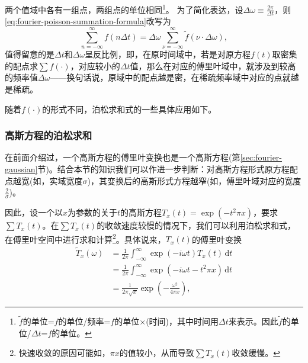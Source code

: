 两个值域中各有一组点，两组点的单位相同\footnote{
$\tilde{f}$的单位=$f$的单位/频率=$f$的单位$\times$(时间)，其中时间用$\Delta t$来表示。因此$\tilde{f}$的单位/$\Delta t$=$f$的单位。}。
为了简化表达，设$\Delta \omega \equiv \frac{2 \pi}{\Delta t}$，则\eqref{eq:fourier-poisson-summation-formula}改写为
\begin{equation}
  \label{eq:fourier-poisson-summation-formula-simp}
  \sum_{n = - \infty}^{\infty} f \left( n \Delta t \right)
  = \Delta \omega \sum_{\nu = - \infty}^{\infty}
  \tilde{f} \left( \nu \cdot \Delta \omega \right),
\end{equation}
值得留意的是$\Delta t$和$\Delta \omega$呈反比例，即，在原时间域中，若是对原方程$f(t)$取密集的配点求$\sum f(\cdot)$，对应较小的$\Delta t$值，那么在对应的傅里叶域中，就涉及到较高的频率值$\Delta \omega$——换句话说，原域中的配点越是密，在稀疏频率域中对应的点就越是稀疏。

随着$f(\cdot)$的形式不同，泊松求和式的一些具体应用如下。

\subsubsection{高斯方程的泊松求和}
\label{eq:fourier-poisson-gaussian}

在前面介绍过，一个高斯方程的傅里叶变换也是一个高斯方程(第\ref{sec:fourier-gaussian}节)。结合本节的知识我们可以作进一步判断：对高斯方程形式原方程配点越宽(如，实域宽度$\sigma$)，其变换后的高斯形式方程越窄(如，傅里叶域对应的宽度$\frac{2}{\sigma}$)。

因此，设一个以$x$为参数的关于$t$的高斯方程$ T_{x}(t)=\exp \left( - t^{2} \pi x \right)$，要求$\sum T_{x}(t)$。在$\sum T_{x}(t)$的收敛速度较慢的情况下，我们可以利用泊松求和式，在傅里叶空间中进行求和计算\footnote{快速收敛的原因可能如，$\pi x$的值较小，从而导致$\sum T_{x}(t)$收敛缓慢。}。具体说来，$T_{x}(t)$的傅里叶变换
\begin{equation*}
  \begin{split}
    \widetilde{T}_{x} \left( \omega \right)
    & = \frac{1}{2 \pi} \int_{-\infty}^{\infty} \exp \left( - i \omega t \right) T_{x}(t) \, \mathrm{d} t \\
    & = \frac{1}{2 \pi} \int_{-\infty}^{\infty}
    \exp \left( - i \omega t - t^{2} \pi x \right)  \, \mathrm{d} t \\
    & = \frac{1}{2 \pi \sqrt{x}}
    \exp \left(
    - \frac{\omega^{2}}{4 \pi x}
    \right),
  \end{split}
\end{equation*}
